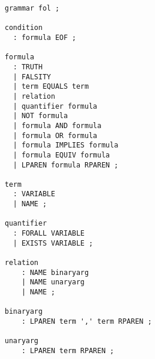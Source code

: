 \begin{verbatim}
grammar fol ;

condition
  : formula EOF ;

formula
  : TRUTH
  | FALSITY
  | term EQUALS term
  | relation
  | quantifier formula
  | NOT formula
  | formula AND formula
  | formula OR formula 
  | formula IMPLIES formula
  | formula EQUIV formula 
  | LPAREN formula RPAREN ;

term
  : VARIABLE
  | NAME ;

quantifier
  : FORALL VARIABLE
  | EXISTS VARIABLE ;

relation
    : NAME binaryarg
    | NAME unaryarg
    | NAME ;

binaryarg
    : LPAREN term ',' term RPAREN ;

unaryarg
    : LPAREN term RPAREN ;

\end{verbatim}
